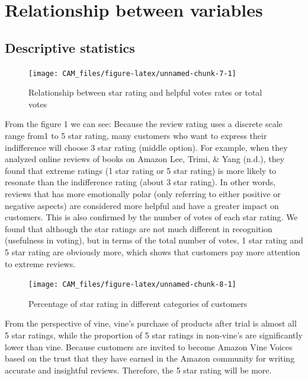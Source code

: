 \documentclass[12pt,a4paper,]{article}
\begin{document}
\hypertarget{relationship-between-variables}{%
\section{Relationship between
variables}\label{relationship-between-variables}}

\hypertarget{descriptive-statistics}{%
\subsection{Descriptive statistics}\label{descriptive-statistics}}

\begin{figure}

{\centering \texttt{[image: CAM\_files/figure-latex/unnamed-chunk-7-1]} 

}

\caption{Relationship between star rating and helpful votes rates or total votes}\label{fig:unnamed-chunk-7}
\end{figure}

From the figure 1 we can see: Because the review rating uses a discrete
scale range from1 to 5 star rating, many customers who want to express
their indifference will choose 3 star rating (middle option). For
example, when they analyzed online reviews of books on Amazon Lee,
Trimi, \& Yang (n.d.), they found that extreme ratings (1 star rating or
5 star rating) is more likely to resonate than the indifference rating
(about 3 star rating). In other words, reviews that has more emotionally
polar (only referring to either positive or negative aspects) are
considered more helpful and have a greater impact on customers. This is
also confirmed by the number of votes of each star rating. We found that
although the star ratings are not much different in recognition
(usefulness in voting), but in terms of the total number of votes, 1
star rating and 5 star rating are obviously more, which shows that
customers pay more attention to extreme reviews.

\begin{figure}

{\centering \texttt{[image: CAM\_files/figure-latex/unnamed-chunk-8-1]} 

}

\caption{Percentage of star rating in different categories of customers}\label{fig:unnamed-chunk-8}
\end{figure}

From the perspective of vine, vine's purchase of products after trial is
almost all 5 star ratings, while the proportion of 5 star ratings in
non-vine's are significantly lower than vine. Because customers are
invited to become Amazon Vine Voices based on the trust that they have
earned in the Amazon community for writing accurate and insightful
reviews. Therefore, the 5 star rating will be more.
\end{document}
